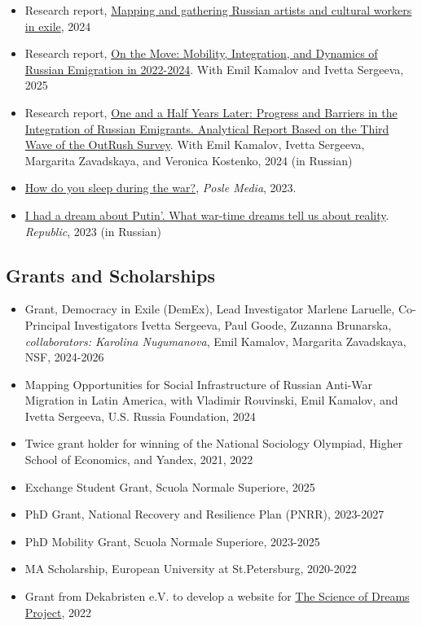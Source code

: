 \documentclass[
]{article}
\providecommand{\tightlist}{%
  \setlength{\itemsep}{0pt}\setlength{\parskip}{0pt}}
\begin{document}
\begin{itemize}
\item
  Research report, \href{https://outrush.io/report_artists_2024}{Mapping
  and gathering Russian artists and cultural workers in exile}, 2024
\item
  Research report, \href{https://outrush.io/report_march_2025_eng}{On
  the Move: Mobility, Integration, and Dynamics of Russian Emigration in
  2022-2024}. With Emil Kamalov and Ivetta Sergeeva, 2025
\item
  Research report, \href{https://outrush.io/report_january_2024}{One and
  a Half Years Later: Progress and Barriers in the Integration of
  Russian Emigrants. Analytical Report Based on the Third Wave of the
  OutRush Survey}. With Emil Kamalov, Ivetta Sergeeva, Margarita
  Zavadskaya, and Veronica Kostenko, 2024 (in Russian)
\item
  \href{https://posle.media/language/en/how-do-you-sleep-during-the-war/}{How
  do you sleep during the war?}, \emph{Posle Media}, 2023.
\item
  \href{https://republic.ru/posts/107912}{I had a dream about Putin'.
  What war-time dreams tell us about reality}. \emph{Republic}, 2023 (in
  Russian)
\end{itemize}

\hypertarget{grants-and-scholarships}{%
\subsection{Grants and Scholarships}\label{grants-and-scholarships}}

\begin{itemize}
\tightlist
\item
  Grant, Democracy in Exile (DemEx), Lead Investigator Marlene Laruelle,
  Co-Principal Investigators Ivetta Sergeeva, Paul Goode, Zuzanna
  Brunarska, \emph{collaborators: Karolina Nugumanova}, Emil Kamalov,
  Margarita Zavadskaya, NSF, 2024-2026
\item
  Mapping Opportunities for Social Infrastructure of Russian Anti-War
  Migration in Latin America, with Vladimir Rouvinski, Emil Kamalov, and
  Ivetta Sergeeva, U.S. Russia Foundation, 2024
\item
  Twice grant holder for winning of the National Sociology Olympiad,
  Higher School of Economics, and Yandex, 2021, 2022
\item
  Exchange Student Grant, Scuola Normale Superiore, 2025
\item
  PhD Grant, National Recovery and Resilience Plan (PNRR), 2023-2027
\item
  PhD Mobility Grant, Scuola Normale Superiore, 2023-2025
\item
  MA Scholarship, European University at St.Petersburg, 2020-2022
\item
  Grant from Dekabristen e.V. to develop a website for
  \href{https://readymag.website/u94255285/wardreams/2/}{The Science of
  Dreams Project}, 2022
\end{itemize}
\end{document}
